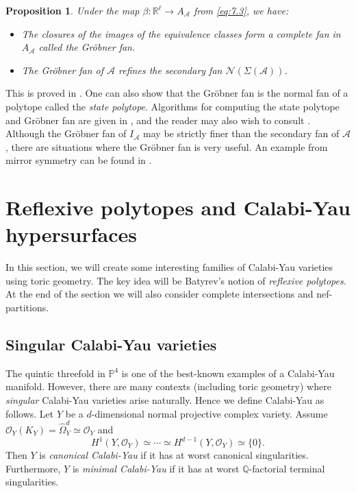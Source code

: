 \documentclass{amsart}
\theoremstyle{plain}
\newtheorem{proposition}[theorem]{Proposition}
\theoremstyle{definition}
\begin{document}
\begin{proposition} Under the map $\beta : \mathbb{R}^\ell \to
A_{\mathcal{A}}$ from \eqref{eq:7.3}, we have:
\begin{itemize}
\item The closures of the images of the equivalence classes form a
complete fan in $A_{\mathcal{A}}$ called the {\rm Gr\"obner fan}.
\item The Gr\"obner fan of $\mathcal{A}$ refines the secondary fan
$\mathcal{N}(\Sigma(\mathcal{A}))$. 
\end{itemize}
\end{proposition}

	This is proved in \cite{Stu2}.  One can also show that the
Gr\"obner fan is the normal fan of a polytope called the {\it state
polytope\/}.  Algorithms for computing the state polytope and
Gr\"obner fan are given in \cite{Stu2}, and the reader may also wish
to consult \cite{MR}.  Although the Gr\"obner fan of $I_{\mathcal{A}}$ may
be strictly finer than the secondary fan of $\mathcal{A}$, there are
situations where the Gr\"obner fan is very useful.  An example from
mirror symmetry can be found in \cite{HLY1}.

\section{Reflexive polytopes and Calabi-Yau hypersurfaces}

	In this section, we will create some interesting families of
Calabi-Yau varieties using toric geometry.  The key idea will be
Batyrev's notion of {\it reflexive polytopes\/}.  At the end of the
section we will also consider complete intersections and
nef-partitions.

	\subsection{Singular Calabi-Yau varieties} The quintic
threefold in $\mathbb{P}^4$ is one of the best-known examples of a
Calabi-Yau manifold.  However, there are many contexts (including
toric geometry) where {\it singular\/} Calabi-Yau varieties arise
naturally.  Hence we define Calabi-Yau as follows.  Let $Y$ be a
$d$-dimensional normal projective complex variety.  Assume 
$\mathcal{O}_Y(K_Y) = \widehat\Omega_Y^d \simeq \mathcal{O}_Y$ and 
\[
H^1(Y,\mathcal{O}_Y) \simeq \cdots \simeq H^{d-1}(Y,\mathcal{O}_Y) \simeq
\{0\}. 
\]
Then $Y$ is {\it canonical Calabi-Yau\/} if it has at worst canonical
singularities.  Furthermore, $Y$ is {\it minimal Calabi-Yau\/} if it
has at worst $\mathbb{Q}$-factorial terminal singularities.
\end{document}
